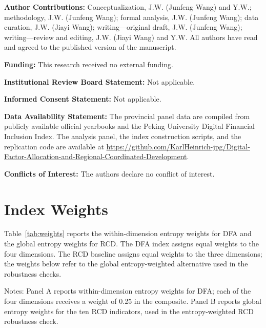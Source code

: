 \documentclass[economies,article,submit]{Definitions/mdpi}
\begin{document}








\vspace{6pt}
\noindent\textbf{Author Contributions:} Conceptualization, J.W. (Junfeng Wang) and Y.W.; methodology, J.W. (Junfeng Wang); formal analysis, J.W. (Junfeng Wang); data curation, J.W. (Jiayi Wang); writing---original draft, J.W. (Junfeng Wang); writing---review and editing, J.W. (Jiayi Wang) and Y.W. All authors have read and agreed to the published version of the manuscript.

\vspace{6pt}
\noindent\textbf{Funding:} This research received no external funding.

\vspace{6pt}
\noindent\textbf{Institutional Review Board Statement:} Not applicable.

\vspace{6pt}
\noindent\textbf{Informed Consent Statement:} Not applicable.

\vspace{6pt}
\noindent\textbf{Data Availability Statement:} The provincial panel data are compiled from publicly available official yearbooks and the Peking University Digital Financial Inclusion Index. The analysis panel, the index construction scripts, and the replication code are available at \url{https://github.com/KarlHeinrich-jpg/Digital-Factor-Allocation-and-Regional-Coordinated-Development}.

\vspace{6pt}
\noindent\textbf{Conflicts of Interest:} The authors declare no conflict of interest.

\appendix
\setcounter{section}{0}
\setcounter{table}{0}
\renewcommand{\thetable}{A\arabic{table}}
\section{Index Weights}\label{app:weights}

Table~\ref{tab:weights} reports the within-dimension entropy weights for DFA and the global entropy weights for RCD. The DFA index assigns equal weights to the four dimensions. The RCD baseline assigns equal weights to the three dimensions; the weights below refer to the global entropy-weighted alternative used in the robustness checks.

\begin{table}[H]
\caption{Entropy weights for DFA and RCD indicators.}\label{tab:weights}
\begin{threeparttable}
\small

\begin{tablenotes}
\small
\item Notes: Panel A reports within-dimension entropy weights for DFA; each of the four dimensions receives a weight of 0.25 in the composite. Panel B reports global entropy weights for the ten RCD indicators, used in the entropy-weighted RCD robustness check.
\end{tablenotes}
\end{threeparttable}
\end{table}
\end{document}
